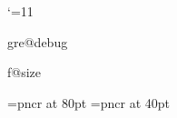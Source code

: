 %
%
%
%
%


\edef\greoldcatcode{\the\catcode`@}
\catcode`\@=11





\def\greerror#1{\errmessage{GregorioTeX error: #1}}%
\def\gre@warning#1{\message{GregorioTeX warning: #1}}%
\def\gre@bug#1{\errmessage{GregorioTeX bug: #1 !! This is a bug in Gregorio.  Please report it at https://github.com/gregorio-project/gregorio/issues}}%


\ifx\csname gre@debug\endcsname\relax%
\else%
  \def\gre@debug{}%
\fi%

\ifx\csname f@size\endcsname\relax%
\else%
  \def\f@size{\directlua{gregoriotex.font_size()}}%
\fi%



\def\greinitialformat#1{%
  {\grefontofinitial #1}%
  \relax %
}%

\def\grebiginitialformat#1{%
  {\grefontofgrebiginitial #1}%
  \relax %
}


\font\gre@fontofbiginitial=pncr at 80pt%
\font\gre@fontofinitial=pncr at 40pt%

\def\gre@format@initial{%
  \begingroup%
  \gre@fontofinitial%
  \relax %
}%
\def\endgre@format@initial{\endgroup}%

\def\gre@format@biginitial{%
  \begingroup%
  \gre@fontofbiginitial%
  \relax %
}%
\def\endgre@format@biginitial{\endgroup}%

